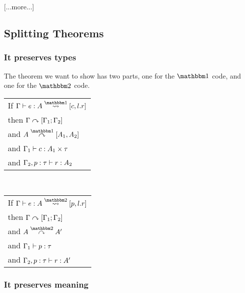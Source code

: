 \documentclass{article}
\begin{document}
[...more...]





\subsection {Splitting Theorems}

\subsubsection{It preserves types}

The theorem we want to show has two parts, one for the $\bbone$ code, and one for the $\bbtwo$ code.  
\begin{center}
\begin{tabular}{l}
If $\splitone {e}{A}{c,l.r}$ \\
then $\Gamma \csplit [\Gamma_1;\Gamma_2]$ \\
and $A \tsplito [A_1,A_2]$ \\
and $ \types [\Gamma_1]{c} {A_1 \times \tau}$ \\
and $ \types [\Gamma_2, p:\tau]{r} {A_2}$ 
\end{tabular}
~~~
\begin{tabular}{l}
If $\splittwo {e}{A}{p,l.r}$ \\
then $\Gamma \csplit [\Gamma_1;\Gamma_2]$ \\
and $A \tsplits A'$ \\
and $ \types [\Gamma_1]{p} {\tau}$ \\
and $ \types [\Gamma_2, p:\tau]{r} {A'}$ 
\end{tabular}
\end{center}

\subsubsection{It preserves meaning}
\end{document}
